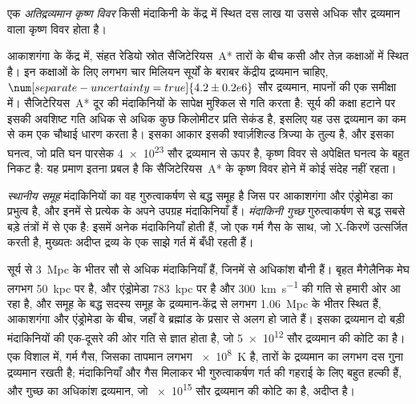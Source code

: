 \begin{definition}[अतिद्रव्यमान कृष्ण विवर]\label{def:b3:milky-way-galaxies:smbh}
एक \emph{अतिद्रव्यमान कृष्ण विवर} किसी मंदाकिनी के केंद्र में स्थित
दस लाख या उससे अधिक सौर द्रव्यमान वाला कृष्ण विवर होता है।
\end{definition}

आकाशगंगा के केंद्र में, संहत रेडियो स्रोत सैजिटेरियस~A*
तारों के बीच कसी और तेज़ कक्षाओं में स्थित है। इन कक्षाओं के लिए
लगभग चार मिलियन सूर्यों के बराबर केंद्रीय द्रव्यमान चाहिए, $\num[separate-uncertainty=true]{4.2 \pm 0.2 e6}$
सौर द्रव्यमान, मापनों की एक समीक्षा में। सैजिटेरियस~A* दूर की मंदाकिनियों के सापेक्ष
मुश्किल से गति करता है: सूर्य की कक्षा हटाने पर इसकी अवशिष्ट गति
अधिक से अधिक कुछ किलोमीटर प्रति सेकंड है, इसलिए यह उस द्रव्यमान का
कम से कम एक चौथाई धारण करता है। इसका आकार इसकी श्वार्ज़शिल्ड
त्रिज्या के तुल्य है, और इसका घनत्व, जो प्रति घन पारसेक \num{4e23} सौर द्रव्यमान से ऊपर है,
कृष्ण विवर से अपेक्षित घनत्व के बहुत निकट है: यह प्रमाण इतना प्रबल है कि
सैजिटेरियस~A* के कृष्ण विवर होने में कोई संदेह नहीं रहता।

\begin{definition}[स्थानीय समूह; मंदाकिनी गुच्छ]\label{def:b3:milky-way-galaxies:groups}
\emph{स्थानीय समूह} मंदाकिनियों का वह गुरुत्वाकर्षण से बद्ध समूह है
जिस पर आकाशगंगा और एंड्रोमेडा का प्रभुत्व है, और इनमें से प्रत्येक के अपने उपग्रह मंदाकिनियाँ हैं।
\emph{मंदाकिनी गुच्छ} गुरुत्वाकर्षण से बद्ध सबसे बड़े तंत्रों में से एक है:
इसमें अनेक मंदाकिनियाँ होती हैं, जो एक गर्म गैस के साथ, जो X-किरणें उत्सर्जित करती है,
मुख्यतः अदीप्त द्रव्य के एक साझे गर्त में
बँधी रहती हैं।
\end{definition}

सूर्य से \qty{3}{Mpc} के भीतर सौ से अधिक मंदाकिनियाँ हैं, जिनमें से अधिकांश
बौनी हैं। बृहत मैगेलैनिक मेघ लगभग \qty{50}{kpc} पर है, और एंड्रोमेडा
\qty{783}{kpc} पर है और \qty{300}{km.s^{-1}} की गति से हमारी ओर आ रहा है, और समूह के बद्ध
सदस्य समूह के द्रव्यमान-केंद्र से लगभग \qty{1.06}{Mpc} के भीतर स्थित हैं,
आकाशगंगा और एंड्रोमेडा के बीच, जहाँ वे ब्रह्मांड के प्रसार से अलग हो जाते हैं।
इसका द्रव्यमान दो बड़ी मंदाकिनियों की एक-दूसरे की ओर गति से ज्ञात होता है,
जो \num{5e12} सौर द्रव्यमान की कोटि का है। एक विशाल  में,
गर्म गैस, जिसका तापमान लगभग \qty{e8}{K} है, तारों के द्रव्यमान का लगभग दस गुना
द्रव्यमान रखती है; मंदाकिनियाँ और गैस मिलाकर भी गुरुत्वाकर्षण गर्त की गहराई के लिए
बहुत हल्की हैं, और गुच्छ का अधिकांश द्रव्यमान, जो
\num{e15} सौर द्रव्यमान की कोटि का है, अदीप्त है।

